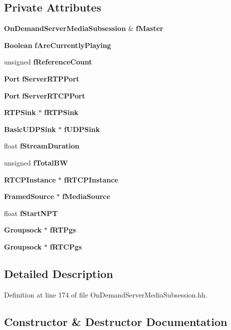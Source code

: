 \subsection*{Private Attributes}
\begin{DoxyCompactItemize}
\item 
{\bf On\+Demand\+Server\+Media\+Subsession} \& {\bf f\+Master}
\item 
{\bf Boolean} {\bf f\+Are\+Currently\+Playing}
\item 
unsigned {\bf f\+Reference\+Count}
\item 
{\bf Port} {\bf f\+Server\+R\+T\+P\+Port}
\item 
{\bf Port} {\bf f\+Server\+R\+T\+C\+P\+Port}
\item 
{\bf R\+T\+P\+Sink} $\ast$ {\bf f\+R\+T\+P\+Sink}
\item 
{\bf Basic\+U\+D\+P\+Sink} $\ast$ {\bf f\+U\+D\+P\+Sink}
\item 
float {\bf f\+Stream\+Duration}
\item 
unsigned {\bf f\+Total\+B\+W}
\item 
{\bf R\+T\+C\+P\+Instance} $\ast$ {\bf f\+R\+T\+C\+P\+Instance}
\item 
{\bf Framed\+Source} $\ast$ {\bf f\+Media\+Source}
\item 
float {\bf f\+Start\+N\+P\+T}
\item 
{\bf Groupsock} $\ast$ {\bf f\+R\+T\+Pgs}
\item 
{\bf Groupsock} $\ast$ {\bf f\+R\+T\+C\+Pgs}
\end{DoxyCompactItemize}


\subsection{Detailed Description}


Definition at line 174 of file On\+Demand\+Server\+Media\+Subsession.\+hh.



\subsection{Constructor \& Destructor Documentation}
